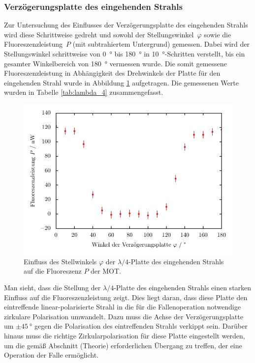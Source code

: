\documentclass[11pt, a4paper]{article}
\numberwithin{equation}{section}
\newcommand{\korr}[1]{{\color{red}(#1)}}
\begin{document}
\subsubsection{Verzögerungsplatte des eingehenden Strahls}
\label{sec:lambda_4_inc}
Zur Untersuchung des Einflusses der Verzögerungsplatte des eingehenden Strahls wird diese Schrittweise gedreht und sowohl der Stellungswinkel~$\varphi$ sowie die Fluoreszenzleistung~$P$ (mit subtrahiertem Untergrund) gemessen.
Dabei wird der Stellungswinkel schrittweise von \SI{0}{\degree} bis \SI{180}{\degree} in \SI{10}{\degree}-Schritten verstellt, bis ein gesamter Winkelbereich von \SI{180}{\degree} vermessen wurde.
Die somit gemessene Fluoreszenzleistung in Abhängigkeit des Drehwinkels der Platte für den eingehenden Strahl wurde in Abbildung \ref{fig:lambda_4_inc} aufgetragen.
Die gemessenen Werte wurden in Tabelle \ref{tab:lambda_4} zusammengefasst.
\begin{figure}[h]
	\centering
	\includegraphics{./figures/lambda_4_in.pdf}
	\caption{Einfluss des Stellwinkels $\varphi$ der $\lambda / 4$-Platte des eingehenden Strahls auf die Fluoreszenz $P$ der MOT.}
	\label{fig:lambda_4_inc}
\end{figure}

Man sieht, dass die Stellung der $\lambda / 4$-Platte des eingehenden Strahls einen starken Einfluss auf die Fluoreszenzleistung zeigt.
Dies liegt daran, dass diese Platte den eintreffende linear-polarisierte Strahl in die für die Fallenoperation notwendige zirkulare Polarisation umwandelt.
Dazu muss die Achse der Verzögerungsplatte um $\pm\SI{45}{\degree}$ gegen die Polarisation des eintreffenden Strahls verkippt sein.
Darüber hinaus muss die richtige Zirkularpolarisation für diese Platte eingestellt werden, um die gemäß Abschnitt \korr{Theorie} erforderlichen Übergang zu treffen, der eine Operation der Falle ermöglicht.
\end{document}
